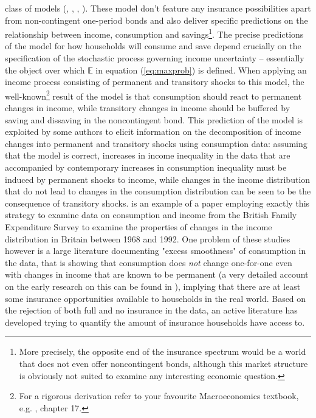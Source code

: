 class of models (\citet{Aiyagari1994}, \citet{Bewley1977}, \citet{Huggett1993},
\citet{Imrohoroglu1989}). These model don't feature any insurance possibilities
apart from non-contingent one-period bonds and also deliver specific predictions
on the relationship between income, consumption and savings\footnote{More precisely,
the opposite end of the insurance spectrum would be a world that does not even
offer noncontingent bonds, although this market structure is obviously not suited
to examine any interesting economic question.}. The precise predictions of the 
model for how households will consume and save depend crucially on the specification
of the stochastic process governing income uncertainty -- essentially the object
over which $\mathbb{E}$ in equation (\ref{eq:maxprob}) is defined. When applying an
income process consisting of permanent and transitory shocks to this model, the 
well-known\footnote{For a rigorous derivation refer to your favourite Macroeconomics
textbook, e.g. \citet{LjungqvistSargent2012}, chapter 17.} result of the model is that consumption
should react to permanent changes in income, while transitory changes in income
should be buffered by saving and dissaving in the noncontingent bond. This 
prediction of the model is exploited by some authors to elicit information on 
the decomposition of income changes into permanent and transitory shocks using 
consumption data: assuming that the model is correct, increases in income 
inequality in the data that are accompanied by contemporary increases in consumption
inequality must be induced by permanent shocks to income, while changes in the 
income distribution that do not lead to changes in the consumption distribution
can be seen to be the consequence of transitory shocks. \citet{BlundellPreston1998}
is an example of a paper employing exactly this strategy to examine data 
on consumption and income from the British Family Expenditure Survey to examine
the properties of changes in the income distribution in Britain between 1968 
and 1992. One problem of these studies however is a large literature documenting 
"excess smoothness" of consumption in the data, that is showing that consumption
does \textit{not} change one-for-one even with changes in income that are known
to be permanent (a very detailed account on the early research on this can be
found in \citealt{Deaton1992book}), implying that there are at least some 
insurance opportunities available to households in the real world. Based on the 
rejection of both full and no insurance in the data, an active literature has 
developed trying to quantify the amount of insurance households have access to.
